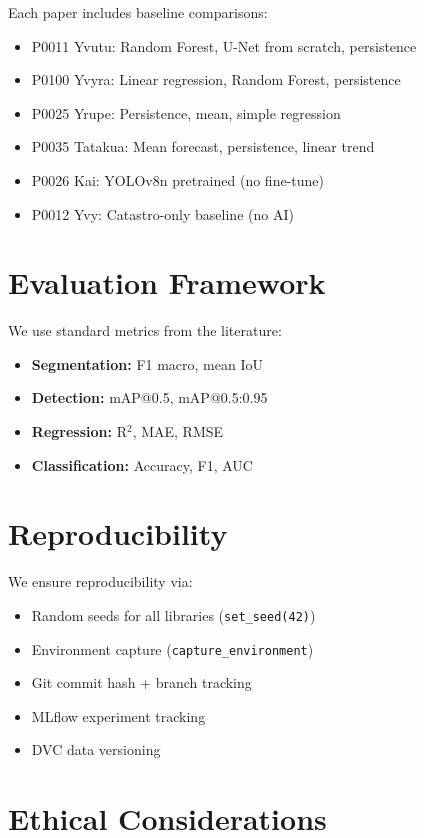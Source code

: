Each paper includes baseline comparisons:

\begin{itemize}
    \item P0011 Yvutu: Random Forest, U-Net from scratch, persistence
    \item P0100 Yvyra: Linear regression, Random Forest, persistence
    \item P0025 Yrupe: Persistence, mean, simple regression
    \item P0035 Tatakua: Mean forecast, persistence, linear trend
    \item P0026 Kai: YOLOv8n pretrained (no fine-tune)
    \item P0012 Yvy: Catastro-only baseline (no AI)
\end{itemize}

\section{Evaluation Framework}

We use standard metrics from the literature:

\begin{itemize}
    \item \textbf{Segmentation:} F1 macro, mean IoU
    \item \textbf{Detection:} mAP@0.5, mAP@0.5:0.95
    \item \textbf{Regression:} R$^2$, MAE, RMSE
    \item \textbf{Classification:} Accuracy, F1, AUC
\end{itemize}

\section{Reproducibility}

We ensure reproducibility via:

\begin{itemize}
    \item Random seeds for all libraries (\texttt{set\_seed(42)})
    \item Environment capture (\texttt{capture\_environment})
    \item Git commit hash + branch tracking
    \item MLflow experiment tracking
    \item DVC data versioning
\end{itemize}

\section{Ethical Considerations}

